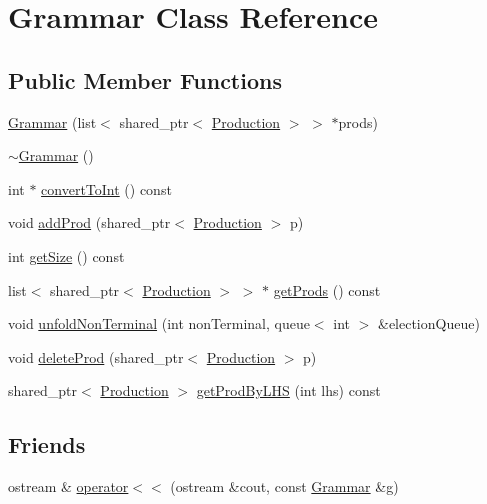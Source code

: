 \hypertarget{classGrammar}{\section{Grammar Class Reference}
\label{classGrammar}
}
\subsection*{Public Member Functions}
\begin{DoxyCompactItemize}
\item 
\hyperlink{classGrammar_adc518572feacb51f9859556ba8c08502}{Grammar} (list$<$ shared\-\_\-ptr$<$ \hyperlink{classProduction}{Production} $>$ $>$ $\ast$prods)
\item 
\hyperlink{classGrammar_a60e8bade0190ee9830d9c600e4216b36}{$\sim$\-Grammar} ()
\item 
int $\ast$ \hyperlink{classGrammar_a359e8a4b597224f0c59594d9c8609cee}{convert\-To\-Int} () const 
\item 
void \hyperlink{classGrammar_a5fe32ff8e6c0842da64898a45ecc4798}{add\-Prod} (shared\-\_\-ptr$<$ \hyperlink{classProduction}{Production} $>$ p)
\item 
int \hyperlink{classGrammar_abb3247e1ddde3fbcbaa66c4ea6595f33}{get\-Size} () const 
\item 
list$<$ shared\-\_\-ptr$<$ \hyperlink{classProduction}{Production} $>$ $>$ $\ast$ \hyperlink{classGrammar_a694a03d8053bb9638acde4fcb82dbd53}{get\-Prods} () const 
\item 
void \hyperlink{classGrammar_a6755b33e54a291cbec28ad7d8af2961a}{unfold\-Non\-Terminal} (int non\-Terminal, queue$<$ int $>$ \&election\-Queue)
\item 
void \hyperlink{classGrammar_a23068f7d1fe5812b8c4bfe5c066e6f7b}{delete\-Prod} (shared\-\_\-ptr$<$ \hyperlink{classProduction}{Production} $>$ p)
\item 
shared\-\_\-ptr$<$ \hyperlink{classProduction}{Production} $>$ \hyperlink{classGrammar_af4e0db12fadf358531a511ca0832f5f1}{get\-Prod\-By\-L\-H\-S} (int lhs) const 
\end{DoxyCompactItemize}
\subsection*{Friends}
\begin{DoxyCompactItemize}
\item 
ostream \& \hyperlink{classGrammar_a54a3c8adc1ef211c3fc4b81e11884337}{operator$<$$<$} (ostream \&cout, const \hyperlink{classGrammar}{Grammar} \&g)
\end{DoxyCompactItemize}


